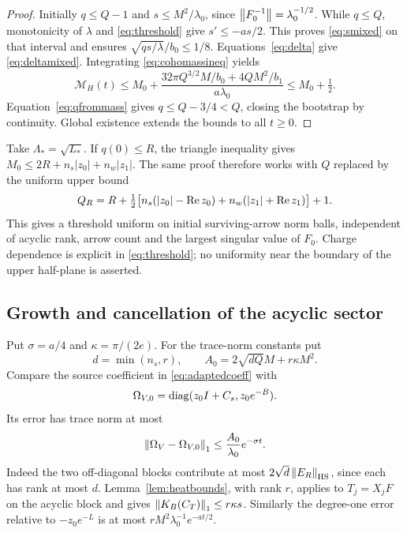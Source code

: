 \begin{proof}
Initially $q\leq Q-1$ and $s\leq M^2/\lambda_0$, since
$\left\lVert F_0^{-1}\right\rVert=\lambda_0^{-1/2}$.
While $q\leq Q$, monotonicity of $\lambda$ and
\eqref{eq:threshold} give $s'\leq-as/2$.
This proves \eqref{eq:smixed} on that interval and ensures
$\sqrt{qs/\lambda}/b_0\leq1/8$.
Equations~\eqref{eq:delta} give \eqref{eq:deltamixed}.
Integrating \eqref{eq:cohomassineq} yields
\[
 \mathcal M_H(t)\leq M_0+
 \frac{32\pi Q^{3/2}M/b_0+4QM^2/b_1}{a\lambda_0}
 \leq M_0+\tfrac12 .
\]
Equation~\eqref{eq:qfrommass} gives $q\leq Q-3/4<Q$, closing
the bootstrap by continuity. Global existence extends the bounds to
all $t\geq0$.
\end{proof}

Take $\Lambda_*=\sqrt{L_*}$. If $q(0)\leq R$, the triangle inequality
gives $M_0\leq2R+n_s|z_0|+n_w|z_1|$. The same proof therefore works
with $Q$ replaced by the uniform upper bound
\begin{equation}\label{eq:QR}
 Q_R=R+\tfrac12\bigl[n_s(|z_0|-\operatorname{Re} z_0)
                         +n_w(|z_1|+\operatorname{Re} z_1)\bigr]+1.
\end{equation}
This gives a threshold uniform on initial surviving-arrow norm balls,
independent of acyclic rank, arrow count and the largest singular value
of $F_0$. Charge dependence is explicit in \eqref{eq:threshold}; no
uniformity near the boundary of the upper half-plane is asserted.

\subsection{Growth and cancellation of the acyclic sector}
Put $\sigma=a/4$ and $\kappa=\pi/(2e)$.
For the trace-norm constants put
\begin{equation}\label{eq:mixedsourceconstant}
 d=\min(n_s,r),\qquad A_0=2\sqrt{dQ}M+r\kappa M^2.
\end{equation}
Compare the source coefficient in \eqref{eq:adaptedcoeff} with
\[
 \Omega_{V,0}=\operatorname{diag}(z_0I+C_s,z_0e^{-B}).
\]
Its error has trace norm at most
\begin{equation}\label{eq:sourceerror}
 \left\lVert\Omega_V-\Omega_{V,0}\right\rVert_1
 \leq\frac{A_0}{\lambda_0}e^{-\sigma t}.
\end{equation}
Indeed the two off-diagonal blocks contribute at most
$2\sqrt d\left\lVert E_R\right\rVert_{\mathrm{HS}}$, since each has rank at most $d$.
Lemma~\ref{lem:heatbounds}, with rank $r$, applies to $T_j=X_jF$
on the acyclic block and gives
$\left\lVert K_B(C_T)\right\rVert_1\leq r\kappa s$.
Similarly the degree-one error relative to $-z_0e^{-L}$ is at most
$rM^2\lambda_0^{-1}e^{-at/2}$.

